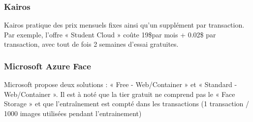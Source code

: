 \subsubsection{Kairos}

Kairos pratique des prix mensuels fixes ainsi qu’un supplément par transaction. Par exemple, l’offre « Student
Cloud » coûte 19\$par mois + 0.02\$ par transaction, avec tout de fois 2 semaines d’essai gratuites.

\subsubsection{Microsoft Azure Face}

Microsoft propose deux solutions : « Free - Web/Container » et « Standard - Web/Container ». Il est à noté que la
tier gratuit ne comprend pas le « Face Storage » et que l’entraînement est compté dans les transactions (1
transaction / 1000 images utilisées pendant l’entrainement)

